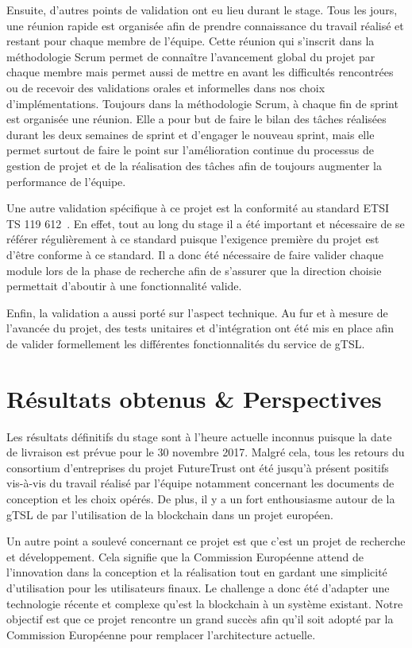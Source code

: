 \documentclass{tnreport}
\begin{document}
Ensuite, d'autres points de validation ont eu lieu durant le stage. Tous les jours, une réunion rapide est organisée afin de prendre connaissance du travail réalisé et restant pour chaque membre de l'équipe. Cette réunion qui s'inscrit dans la méthodologie Scrum permet de connaître l'avancement global du projet par chaque membre mais permet aussi de mettre en avant les difficultés rencontrées ou de recevoir des validations orales et informelles dans nos choix d'implémentations. Toujours dans la méthodologie Scrum, à chaque fin de sprint est organisée une réunion. Elle a pour but de faire le bilan des tâches réalisées durant les deux semaines de sprint et d'engager le nouveau sprint, mais elle permet surtout de faire le point sur l'amélioration continue du processus de gestion de projet et de la réalisation des tâches afin de toujours augmenter la performance de l'équipe. 

Une autre validation spécifique à ce projet est la conformité au standard ETSI TS 119 612~\cite{ETSITS119612}. En effet, tout au long du stage il a été important et nécessaire de se référer régulièrement à ce standard puisque l'exigence première du projet est d'être conforme à ce standard. Il a donc été nécessaire de faire valider chaque module lors de la phase de recherche afin de s'assurer que la direction choisie permettait d'aboutir à une fonctionnalité valide.

Enfin, la validation a aussi porté sur l'aspect technique. Au fur et à mesure de l'avancée du projet, des tests unitaires et d'intégration ont été mis en place afin de valider formellement les différentes fonctionnalités du service de gTSL.

\chapter{Résultats obtenus \& Perspectives}

Les résultats définitifs du stage sont à l'heure actuelle inconnus puisque la date de livraison est prévue pour le 30 novembre 2017. Malgré cela, tous les retours du consortium d'entreprises du projet FutureTrust ont été jusqu'à présent positifs vis-à-vis du travail réalisé par l'équipe notamment concernant les documents de conception et les choix opérés. De plus, il y a un fort enthousiasme autour de la gTSL de par l'utilisation de la blockchain dans un projet européen.

Un autre point a soulevé concernant ce projet est que c'est un projet de recherche et développement. Cela signifie que la Commission Européenne attend de l'innovation dans la conception et la réalisation tout en gardant une simplicité d'utilisation pour les utilisateurs finaux. Le challenge a donc été d'adapter une technologie récente et complexe qu'est la blockchain à un système existant. Notre objectif est que ce projet rencontre un grand succès afin qu'il soit adopté par la Commission Européenne pour remplacer l'architecture actuelle.
\end{document}
